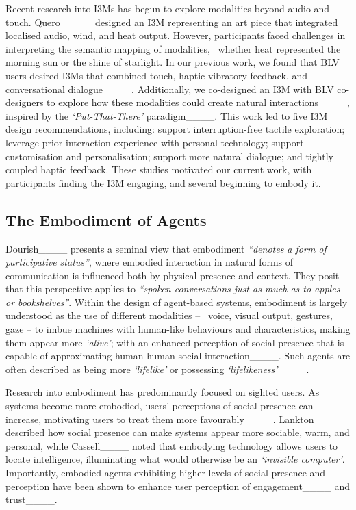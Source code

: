 Recent research into I3Ms has begun to explore modalities beyond audio and touch. Quero \etal____ designed an I3M representing an art piece that integrated localised audio, wind, and heat output. However, participants faced challenges in interpreting the semantic mapping of modalities, \eg\, whether heat represented the morning sun or the shine of starlight. In our previous work, we found that BLV users desired I3Ms that combined touch, haptic vibratory feedback, and conversational dialogue____. Additionally, we co-designed an I3M with BLV co-designers to explore how these modalities could create natural interactions____, inspired by the \textit{`Put-That-There'} paradigm____. This work led to five I3M design recommendations, including: support interruption-free tactile exploration; leverage prior interaction experience with personal technology; support customisation and personalisation; support more natural dialogue; and tightly coupled haptic feedback. These studies motivated our current work, with participants finding the I3M engaging, and several beginning to embody it.

\subsection{The Embodiment of Agents}
Dourish____ presents a seminal view that embodiment \textit{``denotes a form of participative status''}, where embodied interaction in natural forms of communication is influenced both by physical presence and context. They posit that this perspective applies to \textit{``spoken conversations just as much as to apples or bookshelves''}. Within the design of agent-based systems, embodiment is largely understood as the use of different modalities -- \eg\ voice, visual output, gestures, gaze -- to imbue machines with human-like behaviours and characteristics, making them appear more \textit{`alive'}; with an enhanced perception of social presence that is capable of approximating human-human social interaction____. Such agents are often described as being more \textit{`lifelike'} or possessing \textit{`lifelikeness'}____.

Research into embodiment has predominantly focused on sighted users. As systems become more embodied, users' perceptions of social presence can increase, motivating users to treat them more favourably____. Lankton \etal____ described how social presence can make systems appear more sociable, warm, and personal, while Cassell____ noted that embodying technology allows users to locate intelligence, illuminating what would otherwise be an \textit{`invisible computer'}. Importantly, embodied agents exhibiting higher levels of social presence and perception have been shown to enhance user perception of engagement____ and trust____. 

